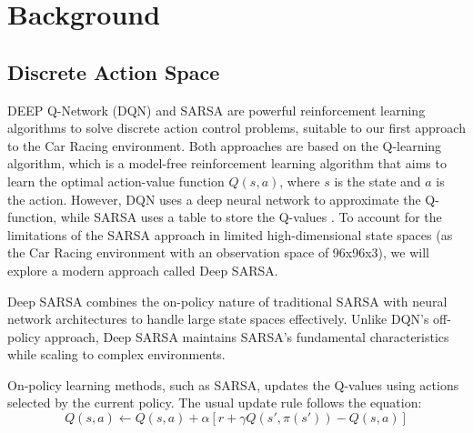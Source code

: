 \documentclass[../CSC_52081_EP.tex]{subfiles}
\begin{document}
    \section{Background}
    \label{sec:background}




    \subsection{Discrete Action Space}

    DEEP Q-Network (DQN) and SARSA are powerful reinforcement learning algorithms to solve discrete action control problems, suitable to our first approach to the Car Racing environment.
    Both approaches are based on the Q-learning algorithm, which is a model-free reinforcement learning algorithm that aims to learn the optimal action-value function $Q(s, a)$, where $s$ is the state and $a$ is the action.
    However, DQN uses a deep neural network to approximate the Q-function, while SARSA uses a table to store the Q-values \cite{Popular_RL}. To account for the limitations of the SARSA approach in limited high-dimensional state spaces (as the Car Racing environment with an observation space of 96x96x3), we will explore a modern approach called Deep SARSA. \cite{Deep_SARSA}

    Deep SARSA combines the on-policy nature of traditional SARSA with neural network architectures to handle large state spaces effectively. Unlike DQN's off-policy approach, Deep SARSA maintains SARSA's fundamental characteristics while scaling to complex environments.

    On-policy learning methods, such as SARSA, updates the Q-values using actions selected by the current policy. The usual update rule follows the equation:
    \begin{equation}
        Q(s, a) \leftarrow Q(s, a) + \alpha \left[ r + \gamma Q(s', \pi(s')) - Q(s, a) \right]
    \end{equation}
\end{document}
